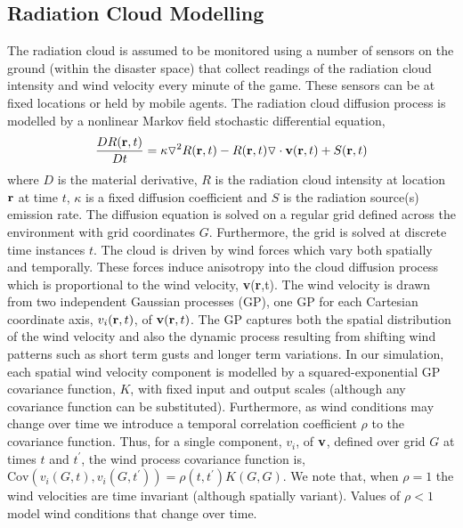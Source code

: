 \subsection{Radiation Cloud Modelling}
The radiation cloud is assumed to be monitored using a number of sensors on the ground (within the disaster space) that collect readings of the radiation cloud intensity and wind velocity every minute of the game. These sensors can be at fixed locations or held by mobile agents.  The radiation cloud diffusion process is modelled by a nonlinear Markov field stochastic differential equation,  
\begin{eqnarray*}
\frac{D R({\bf r}, t)}{D t}=\kappa \triangledown^2 R({\bf r},t)-R({\bf r},t)\triangledown \cdot {\bf v}({\bf r},t)+S({\bf r},t)
\end{eqnarray*}
where $D$ is the material derivative, $R$ is the radiation cloud intensity at location ${\bf r}$ at time $t$, $\kappa$ is a fixed diffusion coefficient and $S$ is the radiation source(s) emission rate. The diffusion equation is solved on a regular grid defined across the environment with grid coordinates $G$.  Furthermore, the grid is solved at discrete time instances $t$.  The cloud is driven by wind forces which vary both spatially and temporally.  These forces induce anisotropy into the cloud diffusion process which is proportional to the wind velocity, {\bf v}({\bf r},t).  The wind velocity is drawn from two independent Gaussian processes (GP), one GP for each Cartesian coordinate axis, $v_i({\bf r},t)$, of ${\bf v}({\bf r},t)$.  The GP captures both the spatial distribution of the wind velocity and also the dynamic process resulting from shifting wind patterns such as short term gusts and longer term variations.  In our simulation, each spatial wind velocity component is modelled by a squared-exponential GP covariance function, $K$, with fixed input and output scales (although any covariance function can be substituted). Furthermore, as wind conditions may change over time we introduce a temporal correlation coefficient $\rho$ to the covariance function.  Thus, for a single component, $v_i$, of ${\bf v}$, defined over grid $G$ at times $t$ and $t^\prime$, the wind process covariance function is, $\text{Cov}(v_i(G,t),v_i(G,t^\prime))=\rho(t,t^\prime) K(G,G)$.  We note that, when $\rho=1$ the wind velocities are time invariant (although spatially variant).  Values of $\rho<1$ model wind conditions that change over time.




